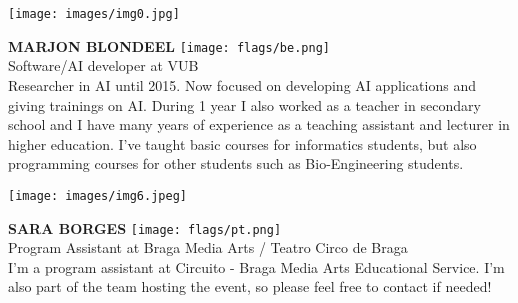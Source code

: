 \noindent
\begin{minipage}{0.3\textwidth}
\centering
\texttt{[image: images/img0.jpg]}
\end{minipage}
\hfill
\begin{minipage}{0.6\textwidth}\raggedright
\color{color1}\uppercase{\textbf{Marjon Blondeel}}
\color{color2}\hspace{0.2cm}\texttt{[image: flags/be.png]}
\\
Software/AI developer at VUB\\
{\footnotesize Researcher in AI until 2015. Now focused on developing AI applications and giving trainings on AI. During 1 year I also worked as a teacher in secondary school and I have many years of experience as a teaching assistant and lecturer in higher education. I've taught basic courses for informatics students, but also programming courses for other students such as Bio-Engineering students. }\\
\end{minipage}
\newline\newline\newline

\noindent
\begin{minipage}{0.3\textwidth}
\centering
\texttt{[image: images/img6.jpeg]}
\end{minipage}
\hfill
\begin{minipage}{0.6\textwidth}\raggedright
\color{color1}\uppercase{\textbf{Sara Borges}}
\color{color2}\hspace{0.2cm}\texttt{[image: flags/pt.png]}
\\
Program Assistant at Braga Media Arts / Teatro Circo de Braga\\
{\footnotesize I'm a program assistant at Circuito - Braga Media Arts Educational Service. I'm also part of the team hosting the event, so please feel free to contact if needed! 
}\\
\end{minipage}
\newline\newline\newline

